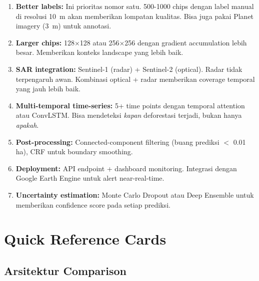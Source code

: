 \documentclass[10pt,a4paper,onecolumn]{article}
\begin{document}
\begin{enumerate}[nosep]
    \item \textbf{Better labels:} Ini prioritas nomor satu. 500-1000
          chips dengan label manual di resolusi 10~m akan memberikan
          lompatan kualitas. Bisa juga pakai Planet imagery (3~m)
          untuk annotasi.
    \item \textbf{Larger chips:} 128$\times$128 atau 256$\times$256
          dengan gradient accumulation lebih besar. Memberikan konteks
          landscape yang lebih baik.
    \item \textbf{SAR integration:} Sentinel-1 (radar) + Sentinel-2
          (optical). Radar tidak terpengaruh awan. Kombinasi optical
          + radar memberikan coverage temporal yang jauh lebih baik.
    \item \textbf{Multi-temporal time-series:} 5+ time points dengan
          temporal attention atau ConvLSTM. Bisa mendeteksi \textit{
          kapan} deforestasi terjadi, bukan hanya \textit{apakah}.
    \item \textbf{Post-processing:} Connected-component filtering
          (buang prediksi $<$ 0.01 ha), CRF untuk boundary smoothing.
    \item \textbf{Deployment:} API endpoint + dashboard monitoring.
          Integrasi dengan Google Earth Engine untuk alert
          near-real-time.
    \item \textbf{Uncertainty estimation:} Monte Carlo Dropout atau
          Deep Ensemble untuk memberikan confidence score pada setiap
          prediksi.
\end{enumerate}

\section{Quick Reference Cards}

\subsection*{Arsitektur Comparison}
\end{document}
